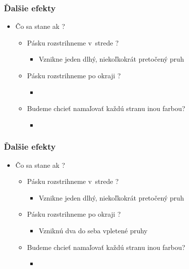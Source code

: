 \documentclass{beamer}
\begin{document}
\begin{frame}
\frametitle{Ďalšie efekty}
\centering
\begin{itemize}
\item Čo sa stane ak ? 
\bigskip
\begin{itemize}
\item Pásku rozstrihneme v~strede ? 
\begin{itemize}
\item  Vznikne jeden dlhý, niekoľkokrát pretočený pruh
\medskip
\end{itemize}
\item Pásku rozstrihneme po okraji ? 
\begin{itemize}
\item []
\medskip
\end{itemize}
\item Budeme chcieť namaľovať každú stranu inou farbou? 
\begin{itemize}
\item []
\medskip
\end{itemize}
\end{itemize}
\end{itemize}
\end{frame} 

\begin{frame}
\frametitle{Ďalšie efekty}
\centering
\begin{itemize}
\item Čo sa stane ak ? 
\bigskip
\begin{itemize}
\item Pásku rozstrihneme v~strede ? 
\begin{itemize}
\item  Vznikne jeden dlhý, niekoľkokrát pretočený pruh
\medskip
\end{itemize}
\item Pásku rozstrihneme po okraji ? 
\begin{itemize}
\item Vzniknú dva do seba vpletené pruhy
\medskip
\end{itemize}
\item Budeme chcieť namaľovať každú stranu inou farbou? 
\begin{itemize}
\item []
\medskip
\end{itemize}
\end{itemize}
\end{itemize}
\end{frame} 
\end{document}
